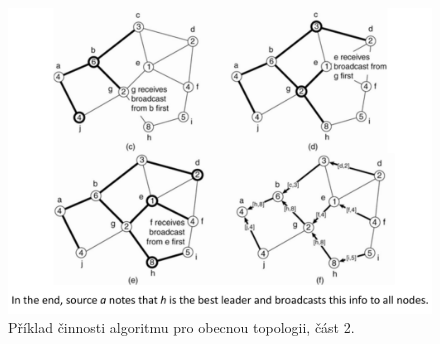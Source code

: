 \begin{figure}[H]
    \centering
    \includegraphics[width=1\linewidth]{example_general_topology_p2.pdf}
    \caption{Příklad činnosti algoritmu pro obecnou topologii, část 2.}
\end{figure}
